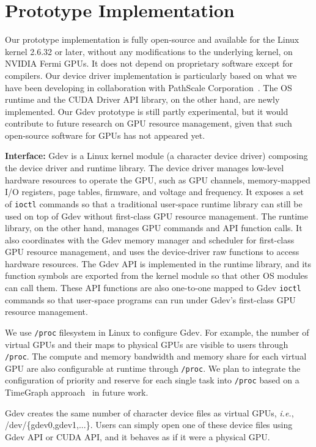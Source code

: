 \section{Prototype Implementation}
\label{sec:implementation}

Our prototype implementation is fully open-source and available for the
Linux kernel 2.6.32 or later, without any modifications to the
underlying kernel, on NVIDIA Fermi GPUs.
It does not depend on proprietary software except for compilers.
Our device driver implementation is particularly based on what we have
been developing in collaboration with PathScale
Corporation~\cite{ENZO}.
The OS runtime and the CUDA Driver API library, on the other hand, are
newly implemented.
Our Gdev prototype is still partly experimental, but it would contribute
to future research on GPU resource management, given that such
open-source software for GPUs has not appeared yet.

\textbf{Interface:}
Gdev is a Linux kernel module (a character device driver) composing the
device driver and runtime library.
The device driver manages low-level hardware resources to operate the
GPU, such as GPU channels, memory-mapped I/O registers, page tables,
firmware, and voltage and frequency.
It exposes a set of \texttt{ioctl} commands so that a traditional
user-space runtime library can still be used on top of Gdev without 
first-class GPU resource management.
The runtime library, on the other hand, manages GPU commands and API
function calls.
It also coordinates with the Gdev memory manager and scheduler for
first-class GPU resource management, and uses
the device-driver raw functions to access hardware resources.
The Gdev API is implemented in the runtime library, and its function
symbols are exported from the kernel module so that other OS modules can
call them.
These API functions are also one-to-one mapped to Gdev \texttt{ioctl}
commands so that user-space programs can run under Gdev's first-class
GPU resource management.

We use \texttt{/proc} filesystem in Linux to configure Gdev.
For example, the number of virtual GPUs and their maps to physical GPUs
are visible to users through \texttt{/proc}.
The compute and memory bandwidth and memory share for each virtual GPU
are also configurable at runtime through \texttt{/proc}.
We plan to integrate the configuration of priority and reserve for
each single task into \texttt{/proc} based on a TimeGraph
approach~\cite{Kato_ATC11} in future work.

Gdev creates the same number of character device files as virtual GPUs,
\textit{i.e.}, /dev/\{gdev0,gdev1,...\}.
Users can simply open one of these device files using Gdev API or CUDA
API, and it behaves as if it were a physical GPU.

